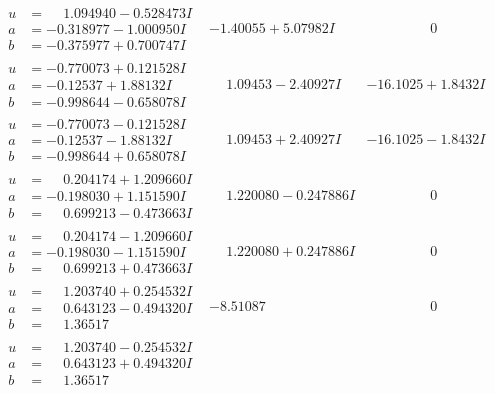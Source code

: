 \documentclass[1p]{elsarticle_modified}
\theoremstyle{definition}
\begin{document}
$$\begin{array}{c|c|c}
\begin{aligned}
u &= \phantom{-}1.094940 - 0.528473 I \\
a &= -0.318977 - 1.000950 I \\
b &= -0.375977 + 0.700747 I\end{aligned}
 & -1.40055 + 5.07982 I & \phantom{-0.000000 } 0 \\ \hline\begin{aligned}
u &= -0.770073 + 0.121528 I \\
a &= -0.12537 + 1.88132 I \\
b &= -0.998644 - 0.658078 I\end{aligned}
 & \phantom{-}1.09453 - 2.40927 I & -16.1025 + 1.8432 I \\ \hline\begin{aligned}
u &= -0.770073 - 0.121528 I \\
a &= -0.12537 - 1.88132 I \\
b &= -0.998644 + 0.658078 I\end{aligned}
 & \phantom{-}1.09453 + 2.40927 I & -16.1025 - 1.8432 I \\ \hline\begin{aligned}
u &= \phantom{-}0.204174 + 1.209660 I \\
a &= -0.198030 + 1.151590 I \\
b &= \phantom{-}0.699213 - 0.473663 I\end{aligned}
 & \phantom{-}1.220080 - 0.247886 I & \phantom{-0.000000 } 0 \\ \hline\begin{aligned}
u &= \phantom{-}0.204174 - 1.209660 I \\
a &= -0.198030 - 1.151590 I \\
b &= \phantom{-}0.699213 + 0.473663 I\end{aligned}
 & \phantom{-}1.220080 + 0.247886 I & \phantom{-0.000000 } 0 \\ \hline\begin{aligned}
u &= \phantom{-}1.203740 + 0.254532 I \\
a &= \phantom{-}0.643123 - 0.494320 I \\
b &= \phantom{-}1.36517\phantom{ +0.000000I}\end{aligned}
 & -8.51087\phantom{ +0.000000I} & \phantom{-0.000000 } 0 \\ \hline\begin{aligned}
u &= \phantom{-}1.203740 - 0.254532 I \\
a &= \phantom{-}0.643123 + 0.494320 I \\
b &= \phantom{-}1.36517\phantom{ +0.000000I}\end{aligned}

\end{array}$$
\end{document}
